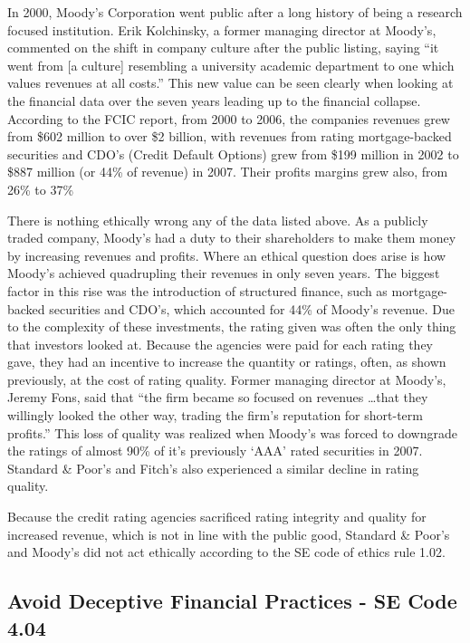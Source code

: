 \documentclass[11pt]{article}
\begin{document}
\begin{multicols}{2}
In 2000, Moody's Corporation went public after a long history of being a research focused institution.  Erik Kolchinsky, a former managing director at Moody's, commented on the shift in company culture after the public listing, saying ``it went from [a culture] resembling a university academic department to one which values revenues at all costs.'' \cite[p.207]{govtReport}  This new value can be seen clearly when looking at the financial data over the seven years leading up to the financial collapse.  According to the FCIC report, from 2000 to 2006, the companies revenues grew from \$602 million to over \$2 billion, with revenues from rating mortgage-backed securities and CDO's (Credit Default Options) grew from \$199 million in 2002 to \$887 million (or 44\% of revenue) in 2007. Their profits margins grew also, from 26\% to 37\% \cite[p.149]{govtReport}

There is nothing ethically wrong any of the data listed above.  As a publicly traded company, Moody's had a duty to their shareholders to make them money by increasing revenues and profits.  Where an ethical question does arise is how Moody's achieved quadrupling their revenues in only seven years.  The biggest factor in this rise was the introduction of structured finance, such as mortgage-backed securities and CDO's, which accounted for 44\% of Moody's revenue.  Due to the complexity of these investments, the rating given was often the only thing that investors looked at.  Because the agencies were paid for each rating they gave, they had an incentive to increase the quantity or ratings, often, as shown previously, at the cost of rating quality.  Former managing director at Moody's, Jeremy Fons, said that ``the firm became so focused on revenues \ldots that they willingly looked the other way, trading the firm's reputation for short-term profits.'' \cite[p.207]{govtReport} This loss of quality was realized when Moody's was forced to downgrade the ratings of almost 90\% of it's previously `AAA' rated securities in 2007.  Standard \& Poor's and Fitch's also experienced a similar decline in rating quality. \cite[p.212]{govtReport} 

Because the credit rating agencies sacrificed rating integrity and quality for increased revenue, which is not in line with the public good, Standard \& Poor's and Moody's did not act ethically according to the SE code of ethics rule 1.02.


\subsection{Avoid Deceptive Financial Practices - SE Code 4.04}


\end{multicols}
\end{document}

